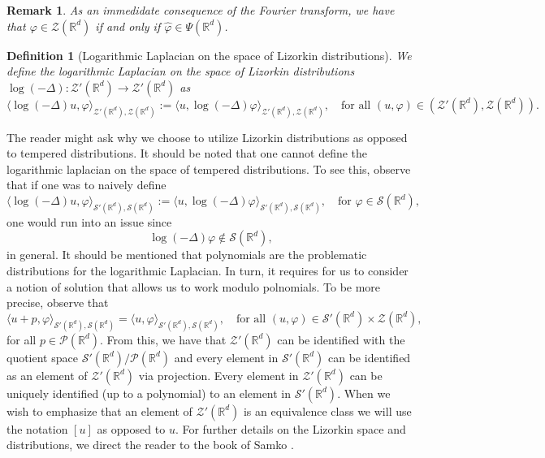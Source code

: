 \documentclass[11pt]{amsart}
\newcommand{\R}{\mathbb{R}}
\newtheorem{definition}{Definition}
\newtheorem{remark}{Remark}
\begin{document}
\begin{remark}\label{rem:psi}
	As an immedidate consequence of the Fourier transform, we have that $\varphi \in \mathcal{Z}(\R^d)$ if and only if $\hat{\varphi}\in \Psi(\R^d)$. 
\end{remark}
\begin{definition}[Logarithmic Laplacian on the space of Lizorkin distributions]
	\label{def:log_laplacian_liz}
	We define the logarithmic Laplacian on the space of Lizorkin distributions $\log(-\Delta):\mathcal{Z}'(\mathbb{R}^d)\rightarrow\mathcal{Z}'(\mathbb{R}^d)$ as
		\begin{equation}\label{eqn:log_lizorkin}
			\langle \log(-\Delta)u,\varphi \rangle_{\mathcal{Z}'(\mathbb{R}^d),\mathcal{Z}(\mathbb{R}^d)}:=		\langle u,\log(-\Delta)\varphi \rangle_{\mathcal{Z}'(\mathbb{R}^d),\mathcal{Z}(\mathbb{R}^d)}, \quad \text{for all $(u,\varphi) \in (\mathcal{Z}'(\mathbb{R}^d),\mathcal{Z}(\mathbb{R}^d))$}.
		\end{equation}
\end{definition}

The reader might ask why we choose to utilize Lizorkin distributions as opposed to tempered distributions. It should be noted that one cannot define the logarithmic laplacian on the space of tempered distributions. To see this, observe that if one was to naively define 
\begin{equation*}
	\langle\log(-\Delta)u,\varphi\rangle_{\mathcal{S}'(\R^d),\mathcal{S}(\R^d)}:=	\langle u,\log(-\Delta)\varphi\rangle_{\mathcal{S}'(\R^d),\mathcal{S}(\R^d)},\quad \text{for $\varphi \in \mathcal{S}(\R^d)$},
\end{equation*}
one would run into an issue since 
\begin{equation*}
	\log(-\Delta)\varphi\notin \mathcal{S}(\R^d),
\end{equation*}
in general. It should be mentioned that polynomials are the problematic distributions for the logarithmic Laplacian. In turn, it requires for us to consider a notion of solution that allows us to work modulo polnomials. To be more precise, observe that  
	\begin{equation*}
	\langle u+ p,\varphi \rangle_{\mathcal{S}'(\R^d),\mathcal{S}(\R^d)}=        \langle u,\varphi \rangle_{\mathcal{S}'(\R^d),\mathcal{S}(\R^d)}, \quad \text{for all $(u,\varphi) \in \mathcal{S}'(\R^d)\times \mathcal{Z}(\R^d),$}
	\end{equation*}
	for all $p\in \mathcal{P}(\R^d)$. From this, we have that 
	$\mathcal{Z}'(\R^d)$ can be identified with the quotient space $\mathcal{S}'(\R^d)/\mathcal{P}(\R^d)$ and every element in $\mathcal{S}'(\R^d)$ can be identified as an element of $\mathcal{Z}'(\R^d)$ via projection. Every element in $\mathcal{Z}'(\R^d)$ can be uniquely identified (up to a polynomial) to an element in $\mathcal{S}'(\R^d)$. When we wish to emphasize that an element of $\mathcal{Z}'(\R^d)$ is an equivalence class we will use the notation $[u]$ as opposed to $u$. For further details on the Lizorkin space and distributions, we direct the reader to the book of Samko \cite{MR1918790}. 
\end{document}
